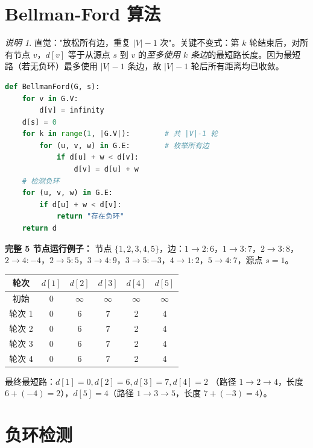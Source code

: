 \documentclass[UTF8,openany,12pt]{ctexbook}
\theoremstyle{remark}
\newtheorem{remark}{说明}[chapter]
\begin{document}
\section{Bellman-Ford 算法}

\begin{remark}
直觉："放松所有边，重复 $|V|-1$ 次"。关键不变式：第 $k$ 轮结束后，对所有节点 $v$，$d[v]$ 等于从源点 $s$ 到 $v$ 的\emph{至多使用 $k$ 条边}的最短路长度。因为最短路（若无负环）最多使用 $|V|-1$ 条边，故 $|V|-1$ 轮后所有距离均已收敛。
\end{remark}

\begin{lstlisting}[language=Python, caption={Bellman-Ford 伪代码}]
def BellmanFord(G, s):
    for v in G.V:
        d[v] = infinity
    d[s] = 0
    for k in range(1, |G.V|):        # 共 |V|-1 轮
        for (u, v, w) in G.E:        # 枚举所有边
            if d[u] + w < d[v]:
                d[v] = d[u] + w
    # 检测负环
    for (u, v, w) in G.E:
        if d[u] + w < d[v]:
            return "存在负环"
    return d
\end{lstlisting}

\textbf{完整 5 节点运行例子：} 节点 $\{1,2,3,4,5\}$，边：$1\to2:6$，$1\to3:7$，$2\to3:8$，$2\to4:-4$，$2\to5:5$，$3\to4:9$，$3\to5:-3$，$4\to1:2$，$5\to4:7$，源点 $s=1$。

\begin{center}
\begin{tabular}{@{}cccccc@{}}
\toprule
轮次 & $d[1]$ & $d[2]$ & $d[3]$ & $d[4]$ & $d[5]$ \\
\midrule
初始     & 0 & $\infty$ & $\infty$ & $\infty$ & $\infty$ \\
轮次 1   & 0 & 6        & 7        & 2        & 4        \\
轮次 2   & 0 & 6        & 7        & 2        & 4        \\
轮次 3   & 0 & 6        & 7        & 2        & 4        \\
轮次 4   & 0 & 6        & 7        & 2        & 4        \\
\bottomrule
\end{tabular}
\end{center}

最终最短路：$d[1]=0, d[2]=6, d[3]=7, d[4]=2$ （路径 $1\to2\to4$，长度 $6+(-4)=2$），$d[5]=4$（路径 $1\to3\to5$，长度 $7+(-3)=4$）。

\section{负环检测}
\end{document}
